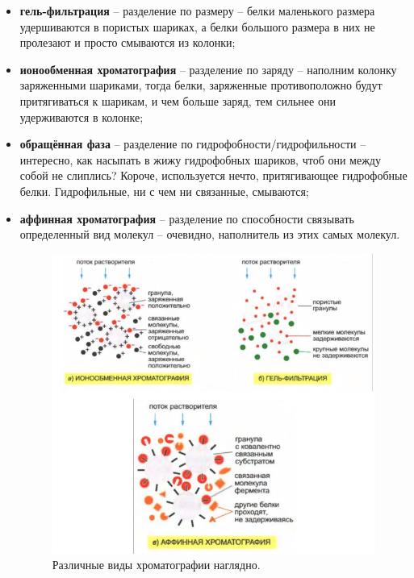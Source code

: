 \begin{itemize}
	\item \textbf{гель-фильтрация} -- разделение по размеру -- белки маленького размера удершиваются в пористых шариках, а белки большого размера в них не пролезают и просто смываются из колонки;
	
	\item \textbf{ионообменная хроматография} -- разделение по заряду -- наполним колонку заряженными шариками, тогда белки, заряженные противоположно будут притягиваться к шарикам, и чем больше заряд, тем сильнее они удерживаются в колонке;	
	
	\item \textbf{обращённая фаза} -- разделение по гидрофобности/гидрофильности -- интересно, как насыпать в жижу гидрофобных шариков, чтоб они между собой не слиплись? Короче, используется нечто, притягивающее гидрофобные белки. Гидрофильные, ни с чем ни связанные, смываются;
	
	\item \textbf{аффинная хроматография} -- разделение по способности связывать определенный вид молекул -- очевидно, наполнитель из этих самых молекул.
	
	\begin{figure}[H]
	\centering
	\includegraphics[width=\linewidth]{Pictures/Cromato.jpg}
	\caption{Различные виды хроматографии наглядно.}
\end{figure}
\end{itemize}
